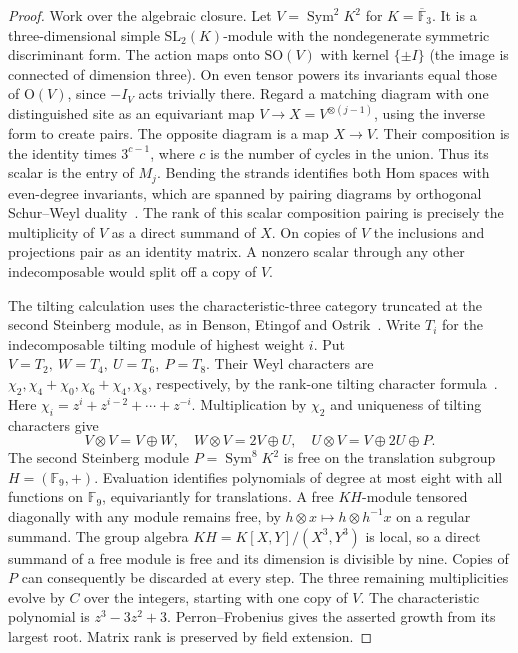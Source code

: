 \documentclass[11pt]{article}
\theoremstyle{definition}
\begin{document}
\begin{proof}
Work over the algebraic closure. Let \(V=\operatorname{Sym}^2 K^2\) for \(K=\overline{\mathbb F}_3\). It is a three-dimensional simple \(\mathrm{SL}_2(K)\)-module with the nondegenerate symmetric discriminant form. The action maps onto \(\mathrm{SO}(V)\) with kernel \(\{\pm I\}\) (the image is connected of dimension three). On even tensor powers its invariants equal those of \(\mathrm O(V)\), since \(-I_V\) acts trivially there. Regard a matching diagram with one distinguished site as an equivariant map \(V\to X=V^{\otimes(j-1)}\), using the inverse form to create pairs. The opposite diagram is a map \(X\to V\). Their composition is the identity times \(3^{c-1}\), where \(c\) is the number of cycles in the union. Thus its scalar is the entry of \(M_j\). Bending the strands identifies both Hom spaces with even-degree invariants, which are spanned by pairing diagrams by orthogonal Schur--Weyl duality~\cite[Theorem~1.2]{doty-hu}. The rank of this scalar composition pairing is precisely the multiplicity of \(V\) as a direct summand of \(X\). On copies of \(V\) the inclusions and projections pair as an identity matrix. A nonzero scalar through any other indecomposable would split off a copy of \(V\).

The tilting calculation uses the characteristic-three category truncated at the second Steinberg module, as in Benson, Etingof and Ostrik~\cite[Proposition~3.5, Theorem~4.5(iv) and Section~5.2]{beo-verlinde}.
Write \(T_i\) for the indecomposable tilting module of highest weight \(i\). Put \(V=T_2,\ W=T_4,\ U=T_6,\ P=T_8\). Their Weyl characters are \(\chi_2,\chi_4+\chi_0,\chi_6+\chi_4,\chi_8\), respectively, by the rank-one tilting character formula~\cite[Proposition~3.20]{tilting-sl2}. Here \(\chi_i=z^i+z^{i-2}+\cdots+z^{-i}\). Multiplication by \(\chi_2\) and uniqueness of tilting characters give
\[
 V\otimes V=V\oplus W,\quad W\otimes V=2V\oplus U,\quad
 U\otimes V=V\oplus 2U\oplus P .
\]
The second Steinberg module \(P=\operatorname{Sym}^8 K^2\) is free on the translation subgroup \(H=(\mathbb F_9,+)\). Evaluation identifies polynomials of degree at most eight with all functions on \(\mathbb F_9\), equivariantly for translations. A free \(KH\)-module tensored diagonally with any module remains free, by \(h\otimes x\mapsto h\otimes h^{-1}x\) on a regular summand. The group algebra \(KH=K[X,Y]/(X^3,Y^3)\) is local, so a direct summand of a free module is free and its dimension is divisible by nine. Copies of \(P\) can consequently be discarded at every step. The three remaining multiplicities evolve by \(C\) over the integers, starting with one copy of \(V\). The characteristic polynomial is \(z^3-3z^2+3\). Perron--Frobenius gives the asserted growth from its largest root. Matrix rank is preserved by field extension.


\end{proof}
\end{document}
